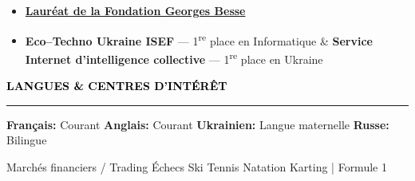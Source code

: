 \documentclass[10pt,english,french]{article}
\newcommand{\chessIcon}[1][black]{\textcolor{#1}{\faChess}}
\newcommand{\skiIcon}[1][black]{\textcolor{#1}{\faSkiing}}
\newcommand{\cryptoIcon}[1][black]{\textcolor{#1}{\faBitcoin}}
\newcommand{\swimmingIcon}[1][black]{\textcolor{#1}{\faSwimmer}}
\newcommand{\mountainsIcon}[1][black]{\textcolor{#1}{\faMountain}}
\newcommand{\speechBubbleIcon}[1][black]{\textcolor{#1}{\faComment}}
\newcommand{\tradingIcon}[1][black]{\textcolor{#1}{\faChartBar}}
\newcommand{\tennisIcon}[1][black]{\textcolor{#1}{\faBaseballBall}}
\newcommand{\flagIcon}[1][black]{\textcolor{#1}{\faFlagCheckered}}
\newlength{\mpwidth}
\newcommand{\cvsection}[1]{
    \vspace{4pt}
    \textbf{\fontsize{9pt}{10pt}\selectfont \textcolor{black}{#1}}
    \vspace{6pt}
    \hrule
    \vspace{6pt}
}
\newcommand{\cvtextnotab}[1]{
    \parbox{1\mpwidth}{#1}
}
\begin{document}
\vspace{-6pt}
\begin{itemize}[leftmargin=0.35cm, label=\textbullet, itemsep=0.15em]
    \item \textbf{\href{https://www.fondationbesse.com/}{Lauréat de la Fondation Georges Besse}}
    \item \textbf{Eco\hspace{3pt}--\hspace{3pt}Techno Ukraine ISEF} --- 1\textsuperscript{re} place en Informatique \& \textbf{Service Internet d'intelligence collective} --- 1\textsuperscript{re} place en Ukraine
\end{itemize}

\vspace{-5pt}
\cvsection{\speechBubbleIcon[black]\hspace{4pt}LANGUES \& CENTRES D'INTÉRÊT}

\vspace{-3pt}
\cvtextnotab{\textbf{Français\!:} Courant \hspace{12pt} \textbf{Anglais\!:} Courant \hspace{12pt} \textbf{Ukrainien\!:} Langue maternelle \hspace{20pt} \textbf{Russe\!:} Bilingue}

\vspace{-8pt}
\cvtextnotab{
    \tradingIcon[black]\hspace{2pt}Marchés financiers / Trading \hspace{12pt}
    \chessIcon[black]\hspace{2pt}Échecs \hspace{12pt}
    \skiIcon[black]\hspace{2pt}Ski \hspace{12pt}
    \tennisIcon[black]\hspace{2pt}Tennis \hspace{12pt}
    \swimmingIcon[black]\hspace{2pt}Natation \hspace{12pt}
    \flagIcon[black]\hspace{2pt}Karting | Formule 1
}
\end{document}

